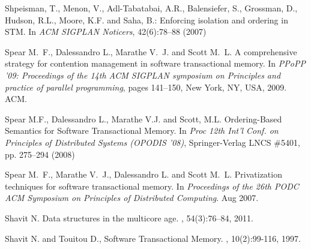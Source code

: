 \begin{thebibliography}{99}
{
 Shpeisman, T.,  Menon, V.,  Adl-Tabatabai, A.R.,  Balensiefer, S.,  Grossman, D.,
 Hudson, R.L., Moore, K.F. and Saha, B.:
\newblock Enforcing isolation and ordering in STM. 
\newblock In {\it ACM  SIGPLAN Noticers}, 42(6):78--88  (2007)

Spear M.~F., Dalessandro L., Marathe V.~J. and  Scott M.~L.
\newblock A comprehensive strategy for contention management in software
  transactional memory.
\newblock In {\em PPoPP '09: Proceedings of the 14th ACM SIGPLAN symposium on
  Principles and practice of parallel programming}, pages 141--150, New York,
  NY, USA, 2009. ACM.


Spear M.F.,  Dalessandro L.,  Marathe V.J. and  Scott, M.L.
\newblock Ordering-Based Semantics for Software Transactional Memory. 
\newblock In {\it Proc  12th Int'l Conf. on Principles of Distributed Systems 
(OPODIS '08)},  Springer-Verlag LNCS \#5401, pp. 275--294 (2008) 



Spear M.~F., Marathe V.~J., Dalessandro L. and Scott M.~L.
\newblock Privatization techniques for software transactional memory.
\newblock In {\em Proceedings of the 26th PODC ACM Symposium on Principles of
  Distributed Computing}. Aug 2007.








Shavit N.
\newblock Data structures in the multicore age.
, 54(3):76--84, 2011.

% 



Shavit N. and Touitou D., 
\newblock Software Transactional Memory. 
, 10(2):99-116, 1997. 


}
\end{thebibliography}
